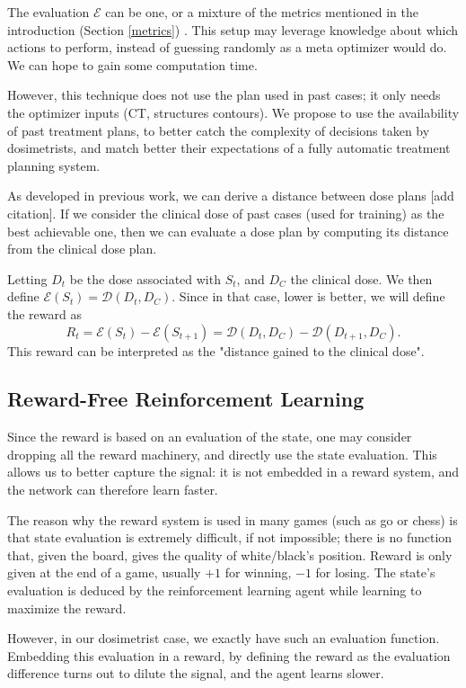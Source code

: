 The evaluation $\mathcal{E}$ can be one, or a mixture of the metrics mentioned in the introduction (Section \ref{metrics}) \cite{shen_hierarchical_2021} \cite{shen_intelligent_2019} \cite{moreau_reinforcement_2021}.
This setup may leverage knowledge about which actions to perform, instead of guessing randomly as a meta optimizer would do.
We can hope to gain some computation time.

However, this technique does not use the plan used in past cases; it only needs the optimizer inputs (CT, structures contours).
We propose to use the availability of past treatment plans, to better catch the complexity of decisions taken by dosimetrists, and match better their expectations of a fully automatic treatment planning system.

As developed in previous work, we can derive a distance between dose plans [add citation].
If we consider the clinical dose of past cases (used for training) as the best achievable one, then we can evaluate a dose plan by computing its distance from the clinical dose plan.

Letting $D_t$ be the dose associated with $S_t$, and $D_C$ the clinical dose.
We then define $\mathcal{E}(S_t) = \mathcal{D}(D_t, D_C)$.
Since in that case, lower is better, we will define the reward as $$R_t = \mathcal{E}(S_t) - \mathcal{E}(S_{t+1}) = \mathcal{D}(D_t, D_C) - \mathcal{D}(D_{t+1}, D_C).$$
This reward can be interpreted as the "distance gained to the clinical dose".


\subsection{Reward-Free Reinforcement Learning}

Since the reward is based on an evaluation of the state, one may consider dropping all the reward machinery, and directly use the state evaluation.
This allows us to better capture the signal: it is not embedded in a reward system, and the network can therefore learn faster.

The reason why the reward system is used in many games (such as go or chess) is that state evaluation is extremely difficult, if not impossible; there is no function that, given the board, gives the quality of white/black's position.
Reward is only given at the end of a game, usually $+1$ for winning, $-1$ for losing.
The state's evaluation is deduced by the reinforcement learning agent while learning to maximize the reward.

However, in our dosimetrist case, we exactly have such an evaluation function.
Embedding this evaluation in a reward, by defining the reward as the evaluation difference turns out to dilute the signal, and the agent learns slower.

